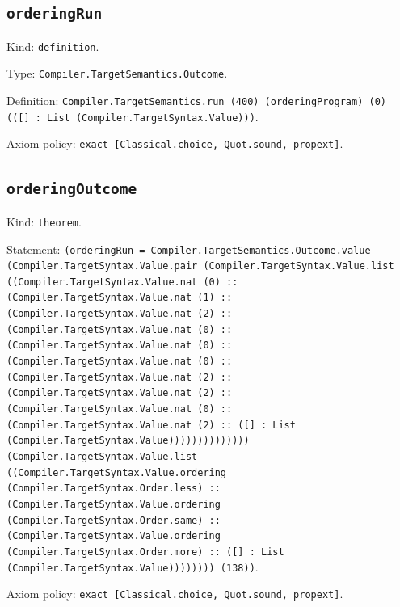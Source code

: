 \documentclass[11pt]{article}
\begin{document}
\subsection*{\texttt{orderingRun}}
\noindent Kind: \texttt{definition}.\par
\noindent Type: \texttt{Compiler.TargetSemantics.Outcome}.\par
\noindent Definition: \texttt{Compiler.TargetSemantics.run (400) (orderingProgram) (0) (([] : List (Compiler.TargetSyntax.Value)))}.\par
\noindent Axiom policy: \texttt{exact [Classical.choice, Quot.sound, propext]}.\par
\subsection*{\texttt{orderingOutcome}}
\noindent Kind: \texttt{theorem}.\par
\noindent Statement: \texttt{(orderingRun = Compiler.TargetSemantics.Outcome.value (Compiler.TargetSyntax.Value.pair (Compiler.TargetSyntax.Value.list ((Compiler.TargetSyntax.Value.nat (0) :: (Compiler.TargetSyntax.Value.nat (1) :: (Compiler.TargetSyntax.Value.nat (2) :: (Compiler.TargetSyntax.Value.nat (0) :: (Compiler.TargetSyntax.Value.nat (0) :: (Compiler.TargetSyntax.Value.nat (0) :: (Compiler.TargetSyntax.Value.nat (2) :: (Compiler.TargetSyntax.Value.nat (2) :: (Compiler.TargetSyntax.Value.nat (0) :: (Compiler.TargetSyntax.Value.nat (2) :: ([] : List (Compiler.TargetSyntax.Value)))))))))))))) (Compiler.TargetSyntax.Value.list ((Compiler.TargetSyntax.Value.ordering (Compiler.TargetSyntax.Order.less) :: (Compiler.TargetSyntax.Value.ordering (Compiler.TargetSyntax.Order.same) :: (Compiler.TargetSyntax.Value.ordering (Compiler.TargetSyntax.Order.more) :: ([] : List (Compiler.TargetSyntax.Value)))))))) (138))}.\par
\noindent Axiom policy: \texttt{exact [Classical.choice, Quot.sound, propext]}.\par
\end{document}
